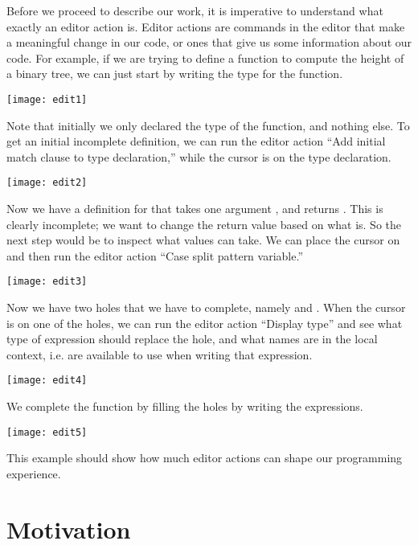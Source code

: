 Before we proceed to describe our work,
it is imperative to understand what exactly an editor action is.
Editor actions are commands in the editor that make a meaningful
change in our code, or ones that give us some information about our
code. For example, if we are trying to define a function to compute the height
of a binary tree, we can just start by writing the type for the function.

\vspace{1em}
\texttt{[image: edit1]}

Note that initially we only declared the type of the function, and nothing
else. To get an initial incomplete definition, we can run the editor action
``Add initial match clause to type declaration,'' while the cursor is on the
type declaration.

\vspace{1em}
\texttt{[image: edit2]}

Now we have a definition for  that takes one argument , and
returns . This is clearly incomplete; we want to change
the return value based on what  is. So the next step would be to inspect
what values  can take. We can place the cursor on  and then run
the editor action ``Case split pattern variable.''

\vspace{1em}
\texttt{[image: edit3]}

Now we have two holes that we have to complete, namely  and
. When the cursor is on one of the holes, we can run the
editor action ``Display type'' and see what type of expression should replace
the hole, and what names are in the local context, i.e. are available to use
when writing that expression.

\vspace{1em}
\texttt{[image: edit4]}

We complete the function by filling the holes by writing the expressions.

\vspace{1em}
\texttt{[image: edit5]}

This example should show how much editor actions can shape our
programming experience.

\section{Motivation}

